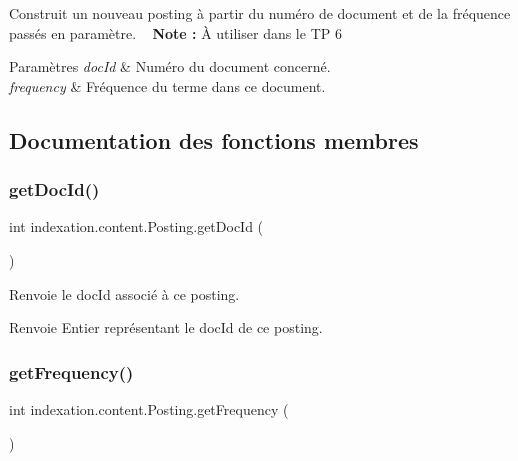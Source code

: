 Construit un nouveau posting à partir du numéro de document et de la fréquence passés en paramètre. ~\newline
 {\bfseries Note \+:} À utiliser dans le TP 6


\begin{DoxyParams}{Paramètres}
{\em doc\+Id} & Numéro du document concerné. \\
\hline
{\em frequency} & Fréquence du terme dans ce document. \\
\hline
\end{DoxyParams}


\subsection{Documentation des fonctions membres}
\mbox{\label{classindexation_1_1content_1_1Posting_a28e341b0a61e7bf6beaa3af24f90af29}} 
\subsubsection{\texorpdfstring{get\+Doc\+Id()}{getDocId()}}
{\footnotesize\ttfamily int indexation.\+content.\+Posting.\+get\+Doc\+Id (\begin{DoxyParamCaption}{ }\end{DoxyParamCaption})}

Renvoie le doc\+Id associé à ce posting.

\begin{DoxyReturn}{Renvoie}
Entier représentant le doc\+Id de ce posting. 
\end{DoxyReturn}
\mbox{\label{classindexation_1_1content_1_1Posting_ae5d70192b6076e0832f4a19a0346fbbb}} 
\subsubsection{\texorpdfstring{get\+Frequency()}{getFrequency()}}
{\footnotesize\ttfamily int indexation.\+content.\+Posting.\+get\+Frequency (\begin{DoxyParamCaption}{ }\end{DoxyParamCaption})}

